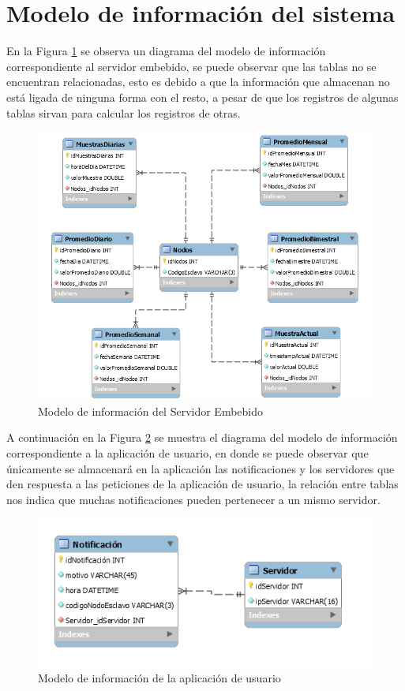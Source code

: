 \section{Modelo de información del sistema}
En la Figura \ref{fig:Base_ServidorEmbebido} se observa un diagrama del modelo de información correspondiente al servidor embebido, se puede observar que las tablas no se encuentran relacionadas, esto es debido a que la información que almacenan no está ligada de ninguna forma con el resto, a pesar de que los registros de algunas tablas sirvan para calcular los registros de otras.
\begin{figure}[H]
	\centering
	\includegraphics[scale=.9]{Capitulo4/images/Base_ServidorEmbebido.PNG}
	\caption{Modelo de información del Servidor Embebido}
	\label{fig:Base_ServidorEmbebido}
\end{figure}

A continuación en la Figura \ref{fig:Base_AplicacionUsuario} se muestra el diagrama del modelo de información correspondiente a la aplicación de usuario, en donde se puede observar que únicamente se almacenará en la aplicación las notificaciones y los servidores que den respuesta a las peticiones de la aplicación de usuario, la relación entre tablas nos indica que muchas notificaciones pueden pertenecer a un mismo servidor.

\begin{figure}[H]
	\centering
	\includegraphics[scale=1.26]{Capitulo4/images/Base_AplicacionUsuario.PNG}
	\caption{Modelo de información de la aplicación de usuario}
	\label{fig:Base_AplicacionUsuario}
\end{figure}